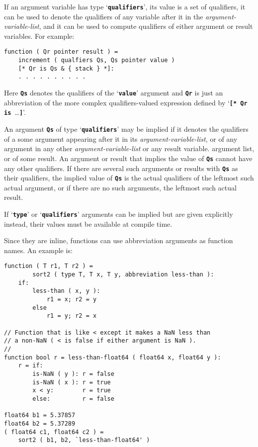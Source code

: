 \documentclass[12pt]{article}
\newcommand{\TT}[1]{{\tt \bfseries #1}}
\newenvironment{indpar}[1][0.3in]%
	{\begin{list}{}%
		     {\setlength{\itemsep}{0in}%
		      \setlength{\topsep}{0in}%
		      \setlength{\parsep}{1ex}%
		      \setlength{\labelwidth}{#1}%
		      \setlength{\leftmargin}{#1}%
		      \addtolength{\leftmargin}{\labelsep}}%
	 \item}%
	{\end{list}}
\begin{document}
If an argument variable has type `\TT{qualifiers}',
its value is a set of qualifiers,
it can be used to denote the qualifiers of any variable
after it in the {\em argument-variable-list}, and it can be
used to compute qualifiers of either argument or result variables.
For example:
\begin{indpar}\begin{verbatim}
function ( Qr pointer result ) =
    increment ( qualfiers Qs, Qs pointer value )
    [* Qr is Qs & { stack } *]:
    . . . . . . . . . .
\end{verbatim}\end{indpar}

Here \TT{Qs} denotes the qualifiers of the `\TT{value}' argument
and \TT{Qr} is just an abbreviation of the more complex
qualifiers-valued expression defined by `\TT{[* Qr is~}\ldots\TT{*]}'.

An argument \TT{Qs} of type `\TT{qualifiers}' may be implied if it
denotes the qualifiers of a some argument appearing
after it in its {\em argument-variable-list},
or of any argument in any other {\em argument-variable-list}
or any result variable.
argument list, or of some result.
An argument or result that implies the value of \TT{Qs}
cannot have any other qualifiers.
If there are several such arguments or results with \TT{Qs}
as their qualifiers,
the implied value of \TT{Qs} is the actual qualifiers of the leftmost such
actual argument, or if there are no such arguments,
the leftmost such actual result.

If `\TT{type}' or `\TT{qualifiers}' arguments can be implied
but are given explicitly instead, their values must be available
at compile time.

Since they are inline, functions can use abbreviation arguments as function
names.  An example is:
\begin{indpar}\begin{verbatim}
function ( T r1, T r2 ) =
        sort2 ( type T, T x, T y, abbreviation less-than ):
    if:
        less-than ( x, y ):
            r1 = x; r2 = y
        else
            r1 = y; r2 = x

// Function that is like < except it makes a NaN less than
// a non-NaN ( < is false if either argument is NaN ).
//
function bool r = less-than-float64 ( float64 x, float64 y ):
    r = if:
        is-NaN ( y ): r = false
        is-NaN ( x ): r = true
        x < y:        r = true
        else:         r = false

float64 b1 = 5.37857
float64 b2 = 5.37289
( float64 c1, float64 c2 ) =
    sort2 ( b1, b2, `less-than-float64' )
\end{verbatim}\end{indpar}
\end{document}
